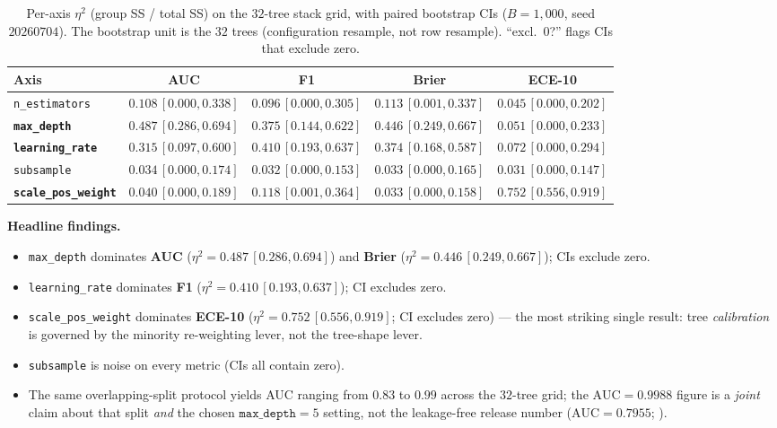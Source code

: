 \begin{table}[t]
\centering\small
\caption{Per-axis $\eta^2$ (group SS / total SS) on the $32$-tree
stack grid, with paired bootstrap CIs ($B{=}1{,}000$, seed $20260704$).
The bootstrap unit is the $32$ trees (configuration resample, not row
resample). ``excl.\ 0?'' flags CIs that exclude zero.}
\label{tab:p8-stack-eta2}
\begin{tabular}{lcccc}
\toprule
Axis & AUC & F1 & Brier & ECE-10 \\
\midrule
\texttt{n\_estimators}     & $0.108\,[0.000,0.338]$ & $0.096\,[0.000,0.305]$ & $0.113\,[0.001,0.337]$ & $0.045\,[0.000,0.202]$ \\
\textbf{\texttt{max\_depth}}       & $\mathbf{0.487\,[0.286,0.694]}$ & $\mathbf{0.375\,[0.144,0.622]}$ & $\mathbf{0.446\,[0.249,0.667]}$ & $0.051\,[0.000,0.233]$ \\
\textbf{\texttt{learning\_rate}}   & $\mathbf{0.315\,[0.097,0.600]}$ & $\mathbf{0.410\,[0.193,0.637]}$ & $\mathbf{0.374\,[0.168,0.587]}$ & $0.072\,[0.000,0.294]$ \\
\texttt{subsample}         & $0.034\,[0.000,0.174]$ & $0.032\,[0.000,0.153]$ & $0.033\,[0.000,0.165]$ & $0.031\,[0.000,0.147]$ \\
\textbf{\texttt{scale\_pos\_weight}} & $0.040\,[0.000,0.189]$ & $\mathbf{0.118\,[0.001,0.364]}$ & $0.033\,[0.000,0.158]$ & $\mathbf{0.752\,[0.556,0.919]}$ \\
\bottomrule
\end{tabular}
\end{table}

\textbf{Headline findings.}
\begin{itemize}
\item \texttt{max\_depth} dominates \textbf{AUC} ($\eta^2{=}0.487\,[0.286,0.694]$)
  and \textbf{Brier} ($\eta^2{=}0.446\,[0.249,0.667]$); CIs exclude zero.
\item \texttt{learning\_rate} dominates \textbf{F1} ($\eta^2{=}0.410\,[0.193,0.637]$);
  CI excludes zero.
\item \texttt{scale\_pos\_weight} dominates \textbf{ECE-10}
  ($\eta^2{=}0.752\,[0.556,0.919]$; CI excludes zero) — the most striking
  single result: tree \emph{calibration} is governed by the minority
  re-weighting lever, not the tree-shape lever.
\item \texttt{subsample} is noise on every metric (CIs all contain zero).
\item The same overlapping-split protocol yields AUC ranging from $0.83$
  to $0.99$ across the $32$-tree grid; the $\mathrm{AUC}{=}0.9988$ figure
  is a \emph{joint} claim about that split \emph{and} the chosen
  $\texttt{max\_depth}{=}5$ setting, not the leakage-free release number
  ($\mathrm{AUC}{=}0.7955$; ).
\end{itemize}

